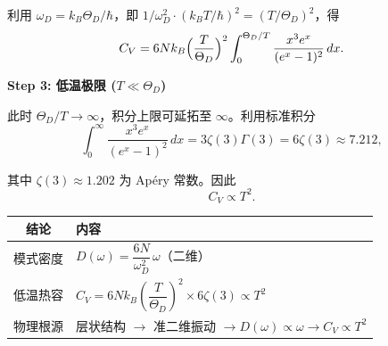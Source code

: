 \begin{derivationbox}[标准解题过程]
利用 $\omega_D=k_B\Theta_D/\hbar$，即 $1/\omega_D^2\cdot(k_BT/\hbar)^2=(T/\Theta_D)^2$，得
\begin{equation}
C_V=6Nk_B\Bigl(\frac{T}{\Theta_D}\Bigr)^2\int_0^{\Theta_D/T}\frac{x^3e^x}{(e^x-1)^2}\,dx.
\end{equation}

\textbf{Step 3: 低温极限 ($T\ll\Theta_D$)}

此时 $\Theta_D/T\to\infty$，积分上限可延拓至 $\infty$。利用标准积分
\begin{equation}
\int_0^{\infty}\frac{x^3e^x}{(e^x-1)^2}\,dx=3\zeta(3)\Gamma(3)=6\zeta(3)\approx7.212,
\end{equation}

其中 $\zeta(3)\approx1.202$ 为 Ap\'ery 常数。因此
\begin{equation}
\boxed{C_V\propto T^2}.
\end{equation}
\end{derivationbox}

\begin{formulabox}[答案汇总]
\begin{center}
\begin{tabular}{cl}
\toprule
结论 & 内容 \\
\midrule
模式密度 & $D(\omega)=\dfrac{6N}{\omega_D^2}\,\omega$（二维） \\
低温热容 & $C_V=6Nk_B\left(\dfrac{T}{\Theta_D}\right)^2\times6\zeta(3)\propto T^2$ \\
物理根源 & 层状结构 $\to$ 准二维振动 $\to D(\omega)\propto\omega\to C_V\propto T^2$ \\
\bottomrule
\end{tabular}
\end{center}
\end{formulabox}

